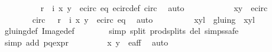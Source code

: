 \begin{isabellebody}
\ \ \ \ \ \ \isamarkupfalse%
\ {\isacartoucheopen}{\isacharparenleft}{\isasymtau}\ {\isasymcirc}\ r\ {\isasymcirc}\ i{\isacharparenright}\ {\isacharparenleft}x{\isacharcomma}\ y{\isacharparenright}\ {\isasymin}\ e{\isacharunderscore}circ{\isacartoucheclose}\ eq\ e{\isacharunderscore}circ{\isacharunderscore}def\ {\isasymtau}{\isacharunderscore}circ\ \isamarkupfalse%
\ auto\isanewline
\ \ \ \ \isanewline
\ \ \ \ \isamarkupfalse%
\ {\isachardoublequoteopen}{\isasymtau}\ {\isacharparenleft}x{\isacharprime}{\isacharcomma}y{\isacharprime}{\isacharparenright}\ {\isasymin}\ e{\isacharunderscore}circ{\isachardoublequoteclose}\ \isanewline
\ \ \ \ \ \ \isamarkupfalse%
\ {\isasymtau}{\isacharunderscore}circ\ {\isacartoucheopen}{\isacharparenleft}{\isasymtau}\ {\isasymcirc}\ r\ {\isasymcirc}\ i{\isacharparenright}\ {\isacharparenleft}x{\isacharcomma}\ y{\isacharparenright}\ {\isasymin}\ e{\isacharunderscore}circ{\isacartoucheclose}\ eq{\isacharparenleft}{}{\isacharparenright}\ \isamarkupfalse%
\ auto\ \isanewline
\ \ \ \ \isamarkupfalse%
\ \isamarkupfalse%
\ {\isachardoublequoteopen}{\isacharparenleft}{\isasymtau}\ {\isacharparenleft}x{\isacharprime}{\isacharcomma}y{\isacharprime}{\isacharparenright}{\isacharcomma}l{\isacharprime}{\isacharplus}{}{\isacharparenright}\ {\isasymin}\ {\isacharparenleft}gluing\ {\isacharbackquote}{\isacharbackquote}\ {\isacharbraceleft}{\isacharparenleft}{\isacharparenleft}x{\isacharprime}{\isacharcomma}y{\isacharprime}{\isacharparenright}{\isacharcomma}l{\isacharprime}{\isacharparenright}{\isacharbraceright}{\isacharparenright}{\isachardoublequoteclose}\isanewline
\ \ \ \ \ \ \isamarkupfalse%
\ gluing{\isacharunderscore}def\ Image{\isacharunderscore}def\ \isanewline
\ \ \ \ \ \ \isamarkupfalse%
{\isacharparenleft}simp\ split{\isacharcolon}\ prod{\isachardot}splits\ del{\isacharcolon}\ {\isasymtau}{\isachardot}simps{\isacharcomma}safe{\isacharparenright}\isanewline
\ \ \ \ \ \ \isamarkupfalse%
\ {\isacharparenleft}simp\ add{\isacharcolon}\ p{\isacharunderscore}q{\isacharunderscore}expr{\isacharparenleft}{}{\isacharparenright}{\isacharparenright}\isanewline
\ \ \ \ \ \ \isamarkupfalse%
\ {\isacartoucheopen}{\isasymtau}\ {\isacharparenleft}x{\isacharprime}{\isacharcomma}\ y{\isacharprime}{\isacharparenright}\ {\isasymin}\ e{\isacharunderscore}aff{\isacartoucheclose}\ \isamarkupfalse%
\ auto{\isacharbrackleft}{}{\isacharbrackright}\isanewline

\end{isabellebody}
